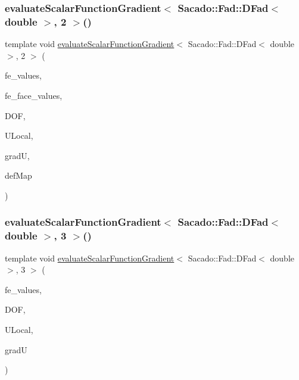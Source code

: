 \subsubsection{\texorpdfstring{evaluateScalarFunctionGradient$<$ Sacado::Fad::DFad$<$ double $>$, 2 $>$()}{evaluateScalarFunctionGradient< Sacado::Fad::DFad< double >, 2 >()}\hspace{0.1cm}{\footnotesize\ttfamily [4/4]}}
{\footnotesize\ttfamily template void \mbox{\hyperlink{group___evaluation_functions_gabedd4ae2841d2332ed0df0513b189e34}{evaluate\+Scalar\+Function\+Gradient}}$<$ Sacado\+::\+Fad\+::\+D\+Fad$<$ double $>$, 2 $>$ (\begin{DoxyParamCaption}\item[{const F\+E\+Values$<$ 2 $>$ \&}]{fe\+\_\+values,  }\item[{const F\+E\+Face\+Values$<$ 2 $>$ \&}]{fe\+\_\+face\+\_\+values,  }\item[{unsigned int}]{D\+OF,  }\item[{Table$<$ 1, Sacado\+::\+Fad\+::\+D\+Fad$<$ double $>$$>$ \&}]{U\+Local,  }\item[{Table$<$ 2, Sacado\+::\+Fad\+::\+D\+Fad$<$ double $>$$>$ \&}]{gradU,  }\item[{\mbox{\hyperlink{structdeformation_map}{deformation\+Map}}$<$ Sacado\+::\+Fad\+::\+D\+Fad$<$ double $>$, 2 $>$ \&}]{def\+Map }\end{DoxyParamCaption})}

\mbox{\label{function_evaluations_8cc_a612155392eef7fae67e40615ddfce82a}} 
\subsubsection{\texorpdfstring{evaluateScalarFunctionGradient$<$ Sacado::Fad::DFad$<$ double $>$, 3 $>$()}{evaluateScalarFunctionGradient< Sacado::Fad::DFad< double >, 3 >()}\hspace{0.1cm}{\footnotesize\ttfamily [1/4]}}
{\footnotesize\ttfamily template void \mbox{\hyperlink{group___evaluation_functions_gabedd4ae2841d2332ed0df0513b189e34}{evaluate\+Scalar\+Function\+Gradient}}$<$ Sacado\+::\+Fad\+::\+D\+Fad$<$ double $>$, 3 $>$ (\begin{DoxyParamCaption}\item[{const F\+E\+Values$<$ 3 $>$ \&}]{fe\+\_\+values,  }\item[{unsigned int}]{D\+OF,  }\item[{Table$<$ 1, Sacado\+::\+Fad\+::\+D\+Fad$<$ double $>$$>$ \&}]{U\+Local,  }\item[{Table$<$ 2, Sacado\+::\+Fad\+::\+D\+Fad$<$ double $>$$>$ \&}]{gradU }\end{DoxyParamCaption})}

